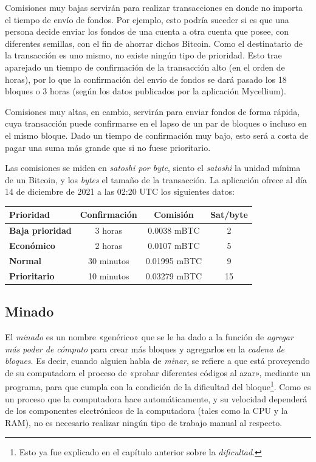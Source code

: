 \documentclass[12pt,a4paper,twoside]{book}
\begin{document}
Comisiones muy bajas servirán para realizar transacciones en donde no importa el tiempo de envío de fondos. Por ejemplo, esto podría suceder si es que una persona decide enviar los fondos de una cuenta a otra cuenta que posee, con diferentes semillas, con el fin de ahorrar dichos Bitcoin. Como el destinatario de la transacción es uno mismo, no existe ningún tipo de prioridad. Esto trae aparejado un tiempo de confirmación de la transacción alto (en el orden de horas), por lo que la confirmación del envío de fondos se dará pasado los 18 bloques o 3 horas (según los datos publicados por la aplicación Mycellium).

Comisiones muy altas, en cambio, servirán para enviar fondos de forma rápida, cuya transacción puede confirmarse en el lapso de un par de bloques o incluso en el mismo bloque. Dado un tiempo de confirmación muy bajo, esto será a costa de pagar una suma más grande que si no fuese prioritario.

Las comisiones se miden en \textit{satoshi por byte}, siento el \textit{satoshi} la unidad mínima de un Bitcoin, y los \textit{bytes} el tamaño de la transacción. La aplicación ofrece al día 14 de diciembre de 2021 a las 02:20 UTC los siguientes datos:

\begin{longtable}{|l|c|c|c|}
\hline
\textbf{Prioridad} & \textbf{Confirmación} & \textbf{Comisión} & \textbf{Sat/byte} \\
\hline
\textbf{Baja prioridad} & 3 horas & 0.0038 mBTC & 2 \\
\hline
\textbf{Económico} & 2 horas & 0.0107 mBTC & 5 \\
\hline
\textbf{Normal} & 30 minutos & 0.01995 mBTC & 9 \\
\hline
\textbf{Prioritario} & 10 minutos & 0.03279 mBTC & 15 \\
\hline
\end{longtable}

\subsection{Minado}
El \textit{minado} es un nombre «genérico» que se le ha dado a la función de \textit{agregar más poder de cómputo} para crear más bloques y agregarlos en la \textit{cadena de bloques}. Es decir, cuando alguien habla de \textit{minar}, se refiere a que está proveyendo de su computadora el proceso de «probar diferentes códigos al azar», mediante un programa, para que cumpla con la condición de la dificultad del bloque\footnote{Esto ya fue explicado en el capítulo anterior sobre la \textit{dificultad}.}. Como es un proceso que la computadora hace automáticamente, y su velocidad dependerá de los componentes electrónicos de la computadora (tales como la CPU y la RAM), no es necesario realizar ningún tipo de trabajo manual al respecto. 
\end{document}
